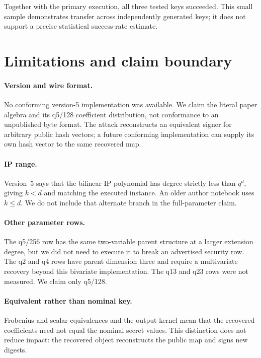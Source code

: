 \documentclass[10pt,a4paper]{article}
\begin{document}
Together with the primary execution, all three tested keys succeeded.  This
small sample demonstrates transfer across independently generated keys; it
does not support a precise statistical success-rate estimate.

\section{Limitations and claim boundary}

\paragraph{Version and wire format.}
No conforming version-5 implementation was available.  We claim the literal
paper algebra and its q5/128 coefficient distribution, not conformance to an
unpublished byte format.  The attack reconstructs an equivalent signer for
arbitrary public hash vectors; a future conforming implementation can supply
its own hash vector to the same recovered map.

\paragraph{IP range.}
Version~5 says that the bilinear IP polynomial has degree strictly less than
$q^d$, giving $k<d$ and matching the executed instance.  An older author
notebook uses $k\le d$.  We do not include that alternate branch in the
full-parameter claim.

\paragraph{Other parameter rows.}
The q5/256 row has the same two-variable parent structure at a larger
extension degree, but we did not need to execute it to break an advertised
security row.  The q2 and q4 rows have parent dimension three and require a
multivariate recovery beyond this bivariate implementation.  The q13 and q23
rows were not measured.  We claim only q5/128.

\paragraph{Equivalent rather than nominal key.}
Frobenius and scalar equivalences and the output kernel mean that the recovered
coefficients need not equal the nominal secret values.  This distinction does
not reduce impact: the recovered object reconstructs the public map and signs
new digests.
\end{document}
